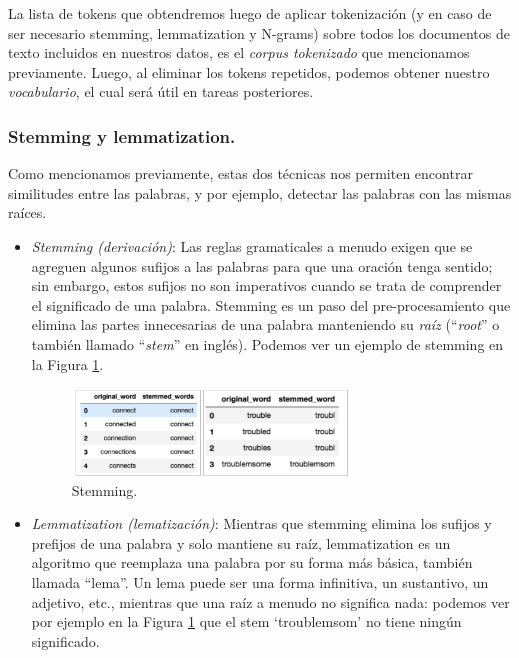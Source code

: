 \documentclass[12pt,a4paper]{article}
\begin{document}
\begin{sloppypar}
La lista de tokens que obtendremos luego de aplicar tokenización (y en caso de ser necesario stemming, lemmatization y N-grams) sobre todos los documentos de texto incluidos en nuestros datos, es el \textit{corpus tokenizado} que mencionamos previamente. Luego, al eliminar los tokens repetidos, podemos obtener nuestro \textit{vocabulario}, el cual será útil en tareas posteriores.

\cleardoublepage

\subsubsection{Stemming y lemmatization.}\label{stem_y_lem}

Como mencionamos previamente, estas dos técnicas nos permiten encontrar similitudes entre las palabras, y por ejemplo, detectar las palabras con las mismas raíces.

\begin{itemize}

\item \textit{Stemming (derivación)}: Las reglas gramaticales a menudo exigen que se agreguen algunos sufijos a las palabras para que una oración tenga sentido; sin embargo, estos sufijos no son imperativos cuando se trata de comprender el significado de una palabra. Stemming es un paso del pre-procesamiento que elimina las partes innecesarias de una palabra manteniendo su \textit{raíz} (“\textit{root}” o también llamado “\textit{stem}” en inglés). Podemos ver un ejemplo de stemming en la Figura \ref{fig:Imagen_NLP_4}.

\begin{figure}[H]    
 \centering
 \includegraphics[width=0.7\textwidth]{images/NLP/4.png}
 \caption{Stemming\cite{NLP_2}.}
 \label{fig:Imagen_NLP_4}
\end{figure}

\item \textit{Lemmatization (lematización)}: Mientras que stemming elimina los sufijos y prefijos de una palabra y solo mantiene su raíz, lemmatization es un algoritmo que reemplaza una palabra por su forma más básica, también llamada “lema”. Un lema puede ser una forma infinitiva, un sustantivo, un adjetivo, etc., mientras que una raíz a menudo no significa nada: podemos ver por ejemplo en la Figura \ref{fig:Imagen_NLP_4} que el stem ‘troublemsom’ no tiene ningún significado. 


\end{itemize}
\end{sloppypar}
\end{document}

